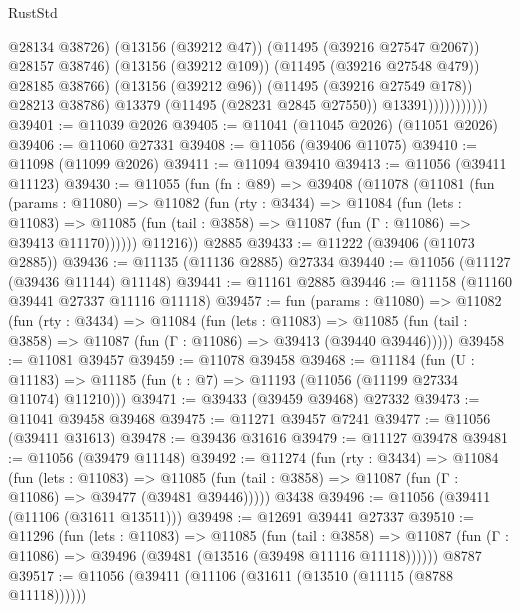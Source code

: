 \begin{lexlean}{RustStd}
\begin{coremodule}
                                  @28134
                                  @38726)
                                (@13156 (@39212 @47))
                                (@11495 (@39216 @27547 @2067))
                                @28157
                                @38746)
                              (@13156 (@39212 @109))
                              (@11495 (@39216 @27548 @479))
                              @28185
                              @38766)
                            (@13156 (@39212 @96))
                            (@11495 (@39216 @27549 @178))
                            @28213
                            @38786)
                          @13379
                          (@11495 (@28231 @2845 @27550))
                          @13391)))))))))))
@39401 := @11039 @2026
@39405 := @11041 (@11045 @2026) (@11051 @2026)
@39406 := @11060 @27331
@39408 := @11056 (@39406 @11075)
@39410 := @11098 (@11099 @2026)
@39411 := @11094 @39410
@39413 := @11056 (@39411 @11123)
@39430 := @11055
    (fun (fn : @89) =>
    @39408
      (@11078
        (@11081
          (fun (params : @11080) =>
          @11082
            (fun (rty : @3434) =>
            @11084
              (fun (lets : @11083) =>
              @11085 (fun (tail : @3858) => @11087 (fun (Γ : @11086) => @39413 @11170))))))
        @11216))
    @2885
@39433 := @11222 (@39406 (@11073 @2885))
@39436 := @11135 (@11136 @2885) @27334
@39440 := @11056 (@11127 (@39436 @11144) @11148)
@39441 := @11161 @2885
@39446 := @11158 (@11160 @39441 @27337 @11116 @11118)
@39457 := fun (params : @11080) =>
  @11082
    (fun (rty : @3434) =>
    @11084
      (fun (lets : @11083) =>
      @11085 (fun (tail : @3858) => @11087 (fun (Γ : @11086) => @39413 (@39440 @39446)))))
@39458 := @11081 @39457
@39459 := @11078 @39458
@39468 := @11184
    (fun (U : @11183) => @11185 (fun (t : @7) => @11193 (@11056 (@11199 @27334 @11074) @11210)))
@39471 := @39433 (@39459 @39468) @27332
@39473 := @11041 @39458 @39468
@39475 := @11271 @39457 @7241
@39477 := @11056 (@39411 @31613)
@39478 := @39436 @31616
@39479 := @11127 @39478
@39481 := @11056 (@39479 @11148)
@39492 := @11274
    (fun (rty : @3434) =>
    @11084
      (fun (lets : @11083) =>
      @11085 (fun (tail : @3858) => @11087 (fun (Γ : @11086) => @39477 (@39481 @39446)))))
    @3438
@39496 := @11056 (@39411 (@11106 (@31611 @13511)))
@39498 := @12691 @39441 @27337
@39510 := @11296
    (fun (lets : @11083) =>
    @11085
      (fun (tail : @3858) =>
      @11087 (fun (Γ : @11086) => @39496 (@39481 (@13516 (@39498 @11116 @11118))))))
    @8787
@39517 := @11056 (@39411 (@11106 (@31611 (@13510 (@11115 (@8788 @11118))))))

\end{coremodule}
\end{lexlean}
